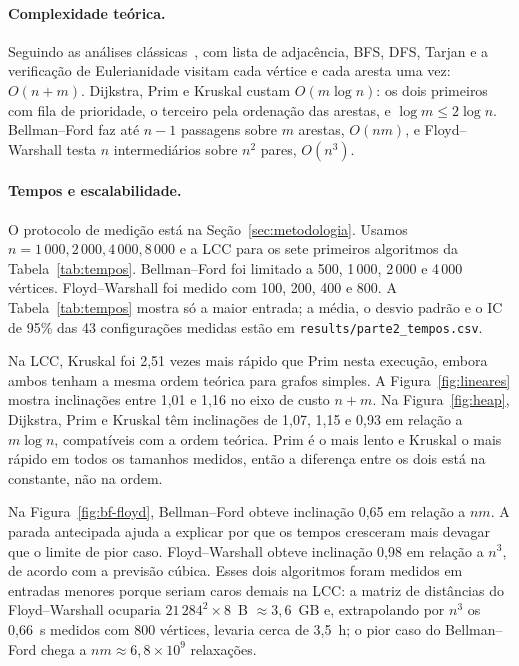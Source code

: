 \documentclass[sigconf,nonacm]{webmedia}
\begin{document}
\paragraph{Complexidade teórica.}
Seguindo as análises clássicas~\cite{cormen2022}, com lista de adjacência, BFS, DFS, Tarjan e a verificação de
Eulerianidade visitam cada vértice e cada aresta uma vez:
\(O(n+m)\). Dijkstra, Prim e Kruskal custam \(O(m\log n)\): os dois
primeiros com fila de prioridade, o terceiro pela ordenação das
arestas, e \(\log m\le2\log n\). Bellman--Ford faz até \(n-1\)
passagens sobre \(m\) arestas, \(O(nm)\), e Floyd--Warshall testa
\(n\) intermediários sobre \(n^2\) pares, \(O(n^3)\).

\paragraph{Tempos e escalabilidade.}
O protocolo de medição está na Seção~\ref{sec:metodologia}. Usamos \(n=1\,000,2\,000,4\,000,8\,000\)
e a LCC para os sete primeiros algoritmos da Tabela~\ref{tab:tempos}.
Bellman--Ford foi limitado a 500, 1\,000, 2\,000 e 4\,000
vértices. Floyd--Warshall foi medido com 100, 200, 400 e 800.
A Tabela~\ref{tab:tempos} mostra só a maior entrada; a média, o
desvio padrão e o IC de 95\% das 43 configurações medidas estão em
\texttt{results/parte2\_tempos.csv}.

Na LCC, Kruskal foi 2,51 vezes mais rápido que Prim nesta
execução, embora ambos tenham a mesma ordem teórica para grafos
simples. A Figura~\ref{fig:lineares} mostra inclinações entre
1,01 e 1,16 no eixo de custo \(n+m\). Na Figura~\ref{fig:heap},
Dijkstra, Prim e Kruskal têm inclinações de 1,07, 1,15 e 0,93 em
relação a \(m\log n\), compatíveis com a ordem teórica. Prim é o mais
lento e Kruskal o mais rápido em todos os tamanhos medidos, então a
diferença entre os dois está na constante, não na ordem.

Na Figura~\ref{fig:bf-floyd}, Bellman--Ford obteve inclinação
0,65 em relação a \(nm\). A parada antecipada
ajuda a explicar por que os tempos cresceram mais devagar que
o limite de pior caso. Floyd--Warshall obteve inclinação
0,98 em relação a \(n^3\), de acordo com a previsão cúbica.
Esses dois algoritmos foram medidos em entradas menores porque
seriam caros demais na LCC: a matriz de distâncias do
Floyd--Warshall ocuparia \(21\,284^2\times8\)~B \(\approx3{,}6\)~GB
e, extrapolando por \(n^3\) os 0,66~s medidos com 800 vértices,
levaria cerca de 3,5~h; o pior caso do Bellman--Ford chega a
\(nm\approx6{,}8\times10^9\) relaxações.
\end{document}
